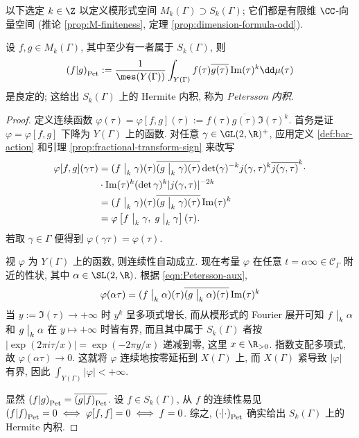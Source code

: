 以下选定 $k \in \Z$ 以定义模形式空间 $M_k(\Gamma) \supset S_k(\Gamma)$; 它们都是有限维 $\CC$-向量空间 (推论 \ref{prop:M-finiteness}, 定理 \ref{prop:dimension-formula-odd}).

\begin{definition-theorem}\label{def:Petersson}  
	设 $f, g \in M_k(\Gamma)$, 其中至少有一者属于 $S_k(\Gamma)$, 则
	\[ \innerPet{f}{g} := \dfrac{1}{\mes(Y(\Gamma))} \int_{Y(\Gamma)} f(\tau) \overline{g(\tau)} \Im(\tau)^k \dd\mu(\tau) \]
	是良定的; 这给出 $S_k(\Gamma)$ 上的 Hermite 内积, 称为 \emph{Petersson 内积}.
\end{definition-theorem}
\begin{proof}
	定义连续函数 $\varphi(\tau) = \varphi[f,g](\tau) := f(\tau) \overline{g(\tau)} \Im(\tau)^k$. 首务是证 $\varphi = \varphi[f,g]$ 下降为 $Y(\Gamma)$ 上的函数. 对任意 $\gamma \in \GL(2,\R)^+$, 应用定义 \ref{def:bar-action} 和引理 \ref{prop:fractional-transform-sign} 来改写
	\begin{equation}\label{eqn:Petersson-aux} \begin{aligned}
		\varphi[f,g](\gamma\tau) & = (f \;\big|_{k} \; \gamma)(\tau) \overline{(g \;\big|_{k} \; \gamma)(\tau)} \det(\gamma)^{-k} j(\gamma, \tau)^k \overline{j(\gamma, \tau)}^k \cdot \\
		& \cdot \operatorname{Im}(\tau)^k (\det\gamma)^k |j(\gamma,\tau)|^{-2k} \\
		& = (f \;\big|_{k} \; \gamma)(\tau) \overline{(g \;\big|_{k} \; \gamma)(\tau)} \operatorname{Im}(\tau)^k \\
		& = \varphi\left[ f \;\big|_{k} \; \gamma, \; g \;\big|_{k} \; \gamma \right](\tau).
	\end{aligned}\end{equation}
	若取 $\gamma \in \Gamma$ 便得到 $ \varphi(\gamma\tau) = \varphi(\tau)$.

	视 $\varphi$ 为 $Y(\Gamma)$ 上的函数, 则连续性自动成立. 现在考量 $\varphi$ 在任意 $t = \alpha\infty \in \mathcal{C}_\Gamma$ 附近的性状, 其中 $\alpha \in \SL(2,\R)$. 根据 \eqref{eqn:Petersson-aux},
	\[ \varphi(\alpha\tau) = (f \;\big|_{k} \; \alpha)(\tau) \overline{(g \;\big|_{k} \; \alpha)(\tau)} \operatorname{Im}(\tau)^k \]
	当 $y := \Im(\tau) \to +\infty$ 时 $y^k$ 呈多项式增长, 而从模形式的 Fourier 展开可知 $f \;\big|_{k} \; \alpha$ 和 $g \;\big|_{k} \; \alpha$ 在 $y \mapsto +\infty$ 时皆有界, 而且其中属于 $S_k(\Gamma)$ 者按 $|\exp(2\pi i\tau/x)| = \exp(-2\pi y/x)$ 递减到零, 这里 $x \in \R_{>0}$. 指数支配多项式, 故 $\varphi(\alpha\tau) \to 0$. 这就将 $\varphi$ 连续地按零延拓到 $X(\Gamma)$ 上, 而 $X(\Gamma)$ 紧导致 $|\varphi|$ 有界, 因此 $\int_{Y(\Gamma)} |\varphi| < + \infty$.
	
	显然 $\left( f \middle| g \right)_{\mathrm{Pet}} = \overline{\left( g \middle| f \right)_{\mathrm{Pet}}}$. 设 $f \in S_k(\Gamma)$, 从 $f$ 的连续性易见 $\left( f \middle| f \right)_{\mathrm{Pet}} = 0 \iff \varphi[f,f] = 0 \iff f=0$. 综之, $\left( \cdot \middle| \cdot \right)_{\mathrm{Pet}}$ 确实给出 $S_k(\Gamma)$ 上的 Hermite 内积.
\end{proof}

